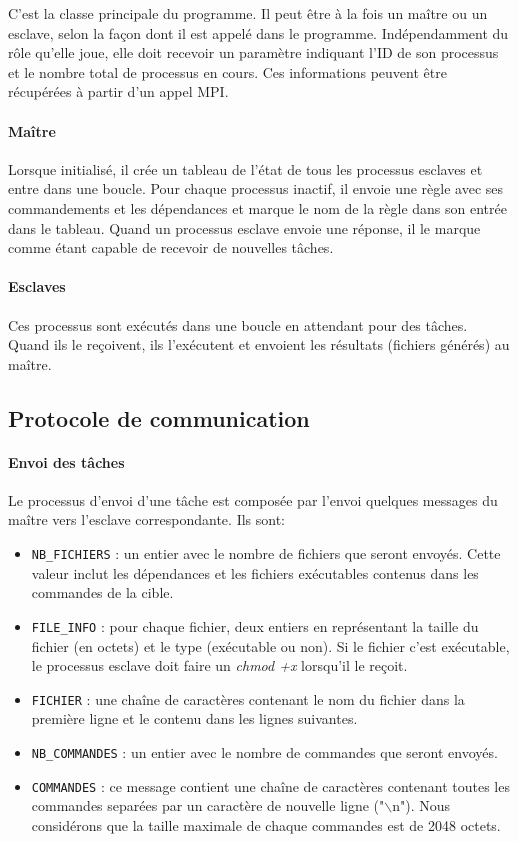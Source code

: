 \documentclass[a4paper,12pt,twoside]{article}
\begin{document}
C'est la classe principale du programme. Il peut être à la fois un maître ou un esclave, selon la façon dont il est appelé dans le programme. Indépendamment du rôle qu'elle joue, elle doit recevoir un paramètre indiquant l'ID de son processus et le nombre total de processus en cours. Ces informations peuvent être récupérées à partir d'un appel MPI.

\paragraph{Maître}

Lorsque initialisé, il crée un tableau de l'état de tous les processus esclaves et entre dans une boucle. Pour chaque processus inactif, il envoie une règle avec ses commandements et les dépendances et marque le nom de la règle dans son entrée dans le tableau. Quand un processus esclave envoie une réponse, il le marque comme étant capable de recevoir de nouvelles tâches.

\paragraph{Esclaves}

Ces processus sont exécutés dans une boucle en attendant pour des tâches. Quand ils le reçoivent, ils l'exécutent et envoient les résultats (fichiers générés) au maître.

\subsection{Protocole de communication}

\paragraph{Envoi des tâches}
Le processus d'envoi d'une tâche est composée par l'envoi quelques messages du maître vers l'esclave correspondante. Ils sont:
\begin{itemize}
\item \texttt{NB\_FICHIERS} : un entier avec le nombre de fichiers que seront envoyés. Cette valeur inclut les dépendances et les fichiers exécutables contenus dans les commandes de la cible.
\item \texttt{FILE\_INFO} : pour chaque fichier, deux entiers en représentant la taille du fichier (en octets) et le type (exécutable ou non). Si le fichier c'est exécutable, le processus esclave doit faire un \emph{chmod +x} lorsqu'il le reçoit.
\item \texttt{FICHIER} : une chaîne de caractères contenant le nom du fichier dans la première ligne et le contenu dans les lignes suivantes.
\item \texttt{NB\_COMMANDES} : un entier avec le nombre de commandes que seront envoyés.
\item \texttt{COMMANDES} : ce message contient une chaîne de caractères contenant toutes les commandes separées par un caractère de nouvelle ligne ("$\backslash$n"). Nous considérons que la taille maximale de chaque commandes est de 2048 octets.
\end{itemize}
\end{document}
